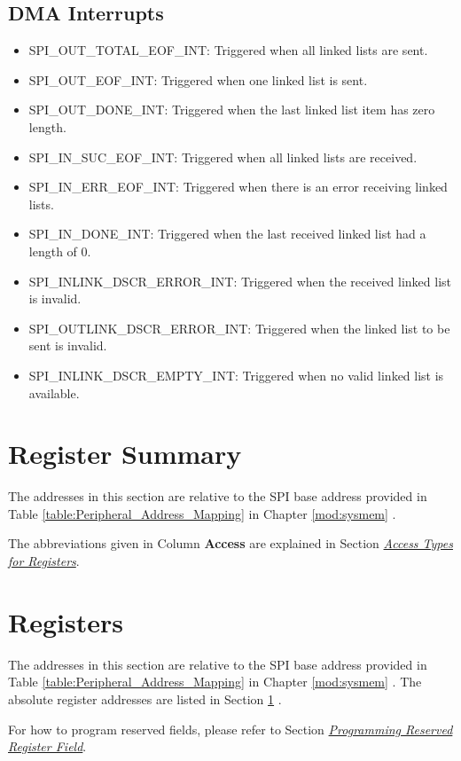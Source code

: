 \documentclass[main\_\_EN.tex]{subfiles}
\begin{document}
\subsection{DMA Interrupts}
\begin{itemize}
\item \label{int:SPIOUTTOTALEOFINT}SPI\_OUT\_TOTAL\_EOF\_INT: Triggered when all linked lists are sent.
\item \label{int:SPIOUTEOFINT}SPI\_OUT\_EOF\_INT: Triggered when one linked list is sent.
\item \label{int:SPIOUTDONEINT}SPI\_OUT\_DONE\_INT: Triggered when the last linked list item has zero length.
\item \label{int:SPIINSUCEOFINT}SPI\_IN\_SUC\_EOF\_INT: Triggered when all linked lists are received.
\item \label{int:SPIINERREOFINT}SPI\_IN\_ERR\_EOF\_INT: Triggered when there is an error receiving linked lists.
\item \label{int:SPIINDONEINT}SPI\_IN\_DONE\_INT: Triggered when the last received linked list had a length of 0.
\item \label{int:SPIINLINKDSCRERRORINT}SPI\_INLINK\_DSCR\_ERROR\_INT: Triggered when the received linked list is invalid.
\item \label{int:SPIOUTLINKDSCRERRORINT}SPI\_OUTLINK\_DSCR\_ERROR\_INT: Triggered when the linked list to be sent is invalid.
\item \label{int:SPIINLINKDSCREMPTYINT}SPI\_INLINK\_DSCR\_EMPTY\_INT: Triggered when no valid linked list is available.
\end{itemize}

\hypertarget{spi-reg-summ}{}
\section{Register Summary} \label{Section:SPIREGList}

The addresses in this section are relative to the SPI base address provided in Table \ref{table:Peripheral_Address_Mapping} in Chapter \ref{mod:sysmem} \textit{}.

The abbreviations given in Column \textbf{Access} are explained in Section \hyperref[glossary-access-types]{\textit{Access Types for Registers}}.



\newpage
\section{Registers}\label{Section:SPIREG}

The addresses in this section are relative to the SPI base address provided in Table \ref{table:Peripheral_Address_Mapping} in Chapter \ref{mod:sysmem} \textit{}. The absolute register addresses are listed in Section \ref{Section:SPIREGList} \textit{}.

For how to program reserved fields, please refer to Section \hyperref[programming-reserved-field]{\textit{Programming Reserved Register Field}}.


\end{document}
